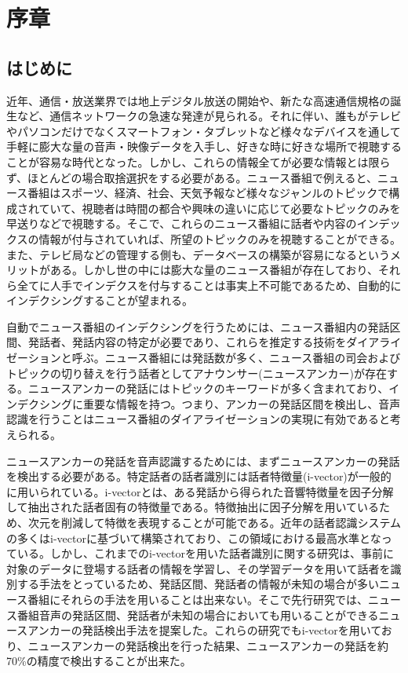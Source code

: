 \chapter{序章}
\section{はじめに}
近年、通信・放送業界では地上デジタル放送の開始や、新たな高速通信規格の誕生など、通信ネットワークの急速な発達が見られる。それに伴い、誰もがテレビやパソコンだけでなくスマートフォン・タブレットなど様々なデバイスを通して手軽に膨大な量の音声・映像データを入手し、好きな時に好きな場所で視聴することが容易な時代となった。しかし、これらの情報全てが必要な情報とは限らず、ほとんどの場合取捨選択をする必要がある。ニュース番組で例えると、ニュース番組はスポーツ、経済、社会、天気予報など様々なジャンルのトピックで構成されていて、視聴者は時間の都合や興味の違いに応じて必要なトピックのみを早送りなどで視聴する。そこで、これらのニュース番組に話者や内容のインデックスの情報が付与されていれば、所望のトピックのみを視聴することができる。また、テレビ局などの管理する側も、データベースの構築が容易になるというメリットがある。しかし世の中には膨大な量のニュース番組が存在しており、それら全てに人手でインデクスを付与することは事実上不可能であるため、自動的にインデクシングすることが望まれる。\par
自動でニュース番組のインデクシングを行うためには、ニュース番組内の発話区間、発話者、発話内容の特定が必要であり、これらを推定する技術をダイアライゼーションと呼ぶ。ニュース番組には発話数が多く、ニュース番組の司会およびトピックの切り替えを行う話者としてアナウンサー(ニュースアンカー)が存在する。ニュースアンカーの発話にはトピックのキーワードが多く含まれており、インデクシングに重要な情報を持つ。つまり、アンカーの発話区間を検出し、音声認識を行うことはニュース番組のダイアライゼーションの実現に有効であると考えられる。\par
ニュースアンカーの発話を音声認識するためには、まずニュースアンカーの発話を検出する必要がある。特定話者の話者識別には話者特徴量(i-vector)が一般的に用いられている\cite{ogawa_ivector}\cite{nishi_multi}。i-vectorとは、ある発話から得られた音響特徴量を因子分解して抽出された話者固有の特徴量である。特徴抽出に因子分解を用いているため、次元を削減して特徴を表現することが可能である。近年の話者認識システムの多くはi-vectorに基づいて構築されており、この領域における最高水準となっている。しかし、これまでのi-vectorを用いた話者識別に関する研究は、事前に対象のデータに登場する話者の情報を学習し、その学習データを用いて話者を識別する手法をとっているため、発話区間、発話者の情報が未知の場合が多いニュース番組にそれらの手法を用いることは出来ない。そこで先行研究\cite{nozaki_gakuseikai}\cite{adachi_gakuseikai}では、ニュース番組音声の発話区間、発話者が未知の場合においても用いることができるニュースアンカーの発話検出手法を提案した。これらの研究でもi-vectorを用いており、ニュースアンカーの発話検出を行った結果、ニュースアンカーの発話を約70\%の精度で検出することが出来た。\par
